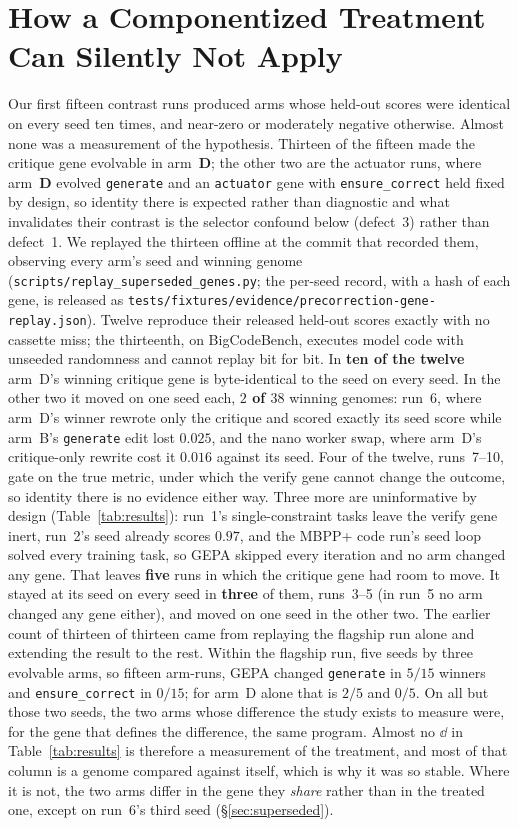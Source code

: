 \documentclass[11pt]{article}
\begin{document}
\section{How a Componentized Treatment Can Silently Not Apply}
\label{sec:defect}

Our first fifteen contrast runs produced arms whose held-out scores were identical on every seed ten times,
and near-zero or moderately negative otherwise. Almost none was a measurement of the hypothesis.
Thirteen of the fifteen made the critique gene evolvable in arm~\textbf{D}; the other two are the
actuator runs, where arm~\textbf{D} evolved \texttt{generate} and an \texttt{actuator} gene with
\texttt{ensure\_correct} held fixed by design, so identity there is expected rather than diagnostic
and what invalidates their contrast is the selector confound below (defect~3) rather than
defect~1. We replayed the thirteen offline at the commit that recorded them, observing every arm's
seed and winning genome (\texttt{scripts/replay\_superseded\_genes.py}; the per-seed record, with a
hash of each gene, is released as
\texttt{tests/fixtures/evidence/precorrection-gene-replay.json}). Twelve reproduce their released
held-out scores exactly with no cassette miss; the thirteenth, on BigCodeBench, executes model code
with unseeded randomness and cannot replay bit for bit. In \textbf{ten of the twelve} arm~D's
winning critique gene is byte-identical to the seed on every seed. In the other two it moved on one
seed each, \textbf{$2$ of $38$} winning genomes: run~6, where arm~D's winner rewrote only the critique
and scored exactly its seed score while arm~B's \texttt{generate} edit lost $0.025$, and the nano
worker swap, where arm~D's critique-only rewrite cost it $0.016$ against its seed. Four of the
twelve, runs~7--10, gate on the true metric, under which the verify gene cannot change the outcome,
so identity there is no evidence either way. Three more are uninformative by design
(Table~\ref{tab:results}): run~1's single-constraint tasks leave the verify gene inert, run~2's
seed already scores $0.97$, and the MBPP+ code run's seed loop solved every training task, so GEPA
skipped every iteration and no arm changed any gene. That leaves \textbf{five} runs in which the
critique gene had room to move. It stayed at its seed on every seed in \textbf{three} of them,
runs~3--5 (in run~5 no arm changed any gene either), and moved on one seed in the other two. The
earlier count of thirteen of thirteen came from replaying the flagship run alone and extending the
result to the rest.
Within the flagship run, five seeds by three evolvable arms, so fifteen arm-runs,
GEPA changed
\texttt{generate} in $5/15$ winners and \texttt{ensure\_correct} in $0/15$; for arm~D alone that
is $2/5$ and $0/5$. On all but those two seeds, the two arms whose
difference the study exists to measure were, for the gene that defines the difference, the
same program. Almost no $\dd$ in Table~\ref{tab:results} is therefore a measurement of the
treatment, and most of that column is a genome compared against itself, which is why it was so
stable. Where it is not, the two arms differ in the gene they \emph{share} rather than in the
treated one, except on run~6's third seed (\S\ref{sec:superseded}).
\end{document}

